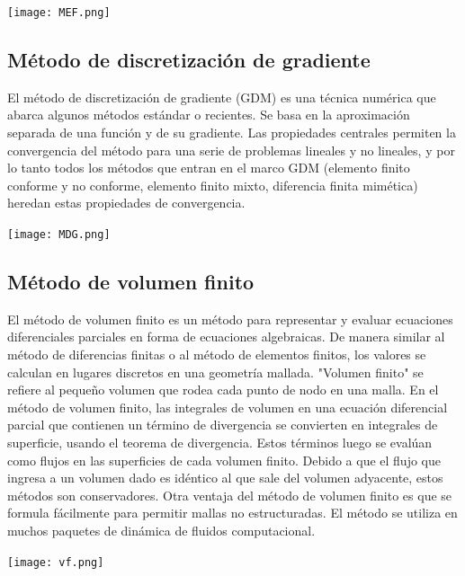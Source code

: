 \documentclass[12pt]{article}
\begin{document}
   \begin{center}
         \texttt{[image: MEF.png]}
   \end{center}
   
   
   \subsection{Método de discretización de gradiente}
   
   El método de discretización de gradiente (GDM) es una técnica numérica que abarca algunos métodos estándar o recientes. Se basa en la aproximación separada de una función y de su gradiente. Las propiedades centrales permiten la convergencia del método para una serie de problemas lineales y no lineales, y por lo tanto todos los métodos que entran en el marco GDM (elemento finito conforme y no conforme, elemento finito mixto, diferencia finita mimética) heredan estas propiedades de convergencia.
   
   \begin{center}
         \texttt{[image: MDG.png]}
   \end{center}
   
   
   \subsection{Método de volumen finito}
   
   El método de volumen finito es un método para representar y evaluar ecuaciones diferenciales parciales en forma de ecuaciones algebraicas. De manera similar al método de diferencias finitas o al método de elementos finitos, los valores se calculan en lugares discretos en una geometría mallada. "Volumen finito" se refiere al pequeño volumen que rodea cada punto de nodo en una malla. En el método de volumen finito, las integrales de volumen en una ecuación diferencial parcial que contienen un término de divergencia se convierten en integrales de superficie, usando el teorema de divergencia. Estos términos luego se evalúan como flujos en las superficies de cada volumen finito. Debido a que el flujo que ingresa a un volumen dado es idéntico al que sale del volumen adyacente, estos métodos son conservadores. Otra ventaja del método de volumen finito es que se formula fácilmente para permitir mallas no estructuradas. El método se utiliza en muchos paquetes de dinámica de fluidos computacional.
   
   \begin{center}
         \texttt{[image: vf.png]}
   \end{center}
   
\end{document}

